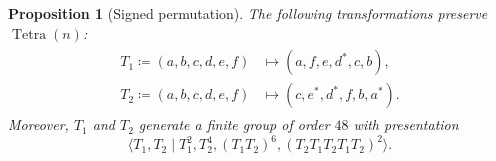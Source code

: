 \documentclass[notitlepage, 11pt, letterpaper]{amsart}
\makeatletter
\theoremstyle{plain}
\newtheorem{prop}[thm]{Proposition}
\theoremstyle{definition}
\DeclareMathOperator{\Tetra}{Tetra}
\newcommand{\ea}{a}
\newcommand{\eb}{b}
\newcommand{\ec}{c}
\newcommand{\ed}{d}
\newcommand{\ee}{e}
\newcommand{\ef}{f}
\newcommand{\tightoctuple}[1]{
\begingroup
\arraycolsep=0.5pt
\renewcommand{\arraystretch}{0.3}
\begin{array}{@{}c@{}cccccc@{}c@{}}#1\end{array}
\endgroup
}
\makeatother
\begin{document}
\begin{prop}[Signed permutation]
    \label{prop:tet_symmetry}
    The following transformations preserve $\Tetra(n)$:
    \begin{align}
        \label{eq:gens_of_tet_sym}
        \begin{split}
            T_1 \coloneqq (\ea, \eb, \ec, \ed, \ee, \ef)
            &\mapsto
            (\ea, \ef, \ee, \ed^{*}, \ec, \eb), \\
            T_2 \coloneqq (\ea, \eb, \ec, \ed, \ee, \ef)
            &\mapsto
            (\ec, \ee^*, \ed^{*}, \ef, \eb, \ea^*).
        \end{split}
    \end{align}
    Moreover, $T_1$ and $T_2$ generate a finite group of order $48$ with presentation
    \begin{equation}
        \langle T_1, T_2 \mid T_1^2, T_2^4, (T_1 T_2)^6, (T_2T_1T_2T_1T_2)^2 \rangle.
    \end{equation}

\end{prop}
\end{document}
